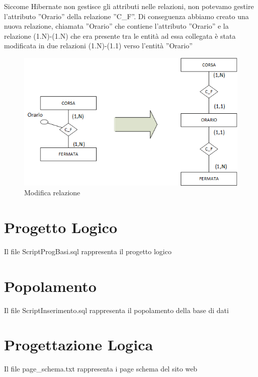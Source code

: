 \documentclass[a4paper,11pt]{book}
\begin{document}
\clearpage

Siccome Hibernate non gestisce gli attributi nelle relazioni, non potevamo gestire l'attributo ''Orario'' della relazione ''C_F''. Di conseguenza abbiamo creato una nuova relazione, chiamata ''Orario'' che contiene l'attributo ''Orario'' e la relazione (1.N)-(1.N) che era presente tra le entità ad essa collegata è stata modificata in due relazioni (1.N)-(1.1) verso l'entità ''Orario''


\begin{figure}[!ht]
\centering
\includegraphics[scale = 0.3]{Modifica.png}
\caption{Modifica relazione}
\end{figure}

\chapter{Progetto Logico}
Il file ScriptProgBasi.sql rappresenta il progetto logico
\chapter{Popolamento}
Il file ScriptInserimento.sql rappresenta il popolamento della base di dati
\chapter{Progettazione Logica}
Il file page_schema.txt rappresenta i page schema del sito web
\end{document}

